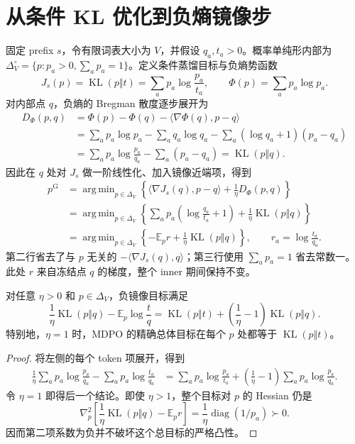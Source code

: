 \documentclass[lang=cn,scheme=chinese,openany]{../book/elegantbook}
\newcommand{\E}{\mathbb E}
\newcommand{\KL}{\operatorname{KL}}
\DeclareMathOperator*{\argmin}{arg\,min}
\begin{document}
\section{从条件 KL 优化到负熵镜像步}
\label{sec:foundation-origin}
固定 prefix $s$，令有限词表大小为 $V$，并假设 $q_a,t_a>0$。概率单纯形内部为 $\Delta_V^\circ=\{p:p_a>0,\sum_a p_a=1\}$。定义条件蒸馏目标与负熵势函数
\begin{equation}
J_s(p)=\KL(p\Vert t)=\sum_a p_a\log\frac{p_a}{t_a},\qquad
\Phi(p)=\sum_a p_a\log p_a.
\end{equation}
对内部点 $q$，负熵的 Bregman 散度逐步展开为
\begin{align}
D_\Phi(p,q)
&=\Phi(p)-\Phi(q)-\langle\nabla\Phi(q),p-q\rangle\\
&=\sum_a p_a\log p_a-\sum_a q_a\log q_a
-\sum_a(\log q_a+1)(p_a-q_a)\\
&=\sum_a p_a\log\frac{p_a}{q_a}-\sum_a(p_a-q_a)
=\KL(p\Vert q).
\end{align}
因此在 $q$ 处对 $J_s$ 做一阶线性化、加入镜像近端项，得到
\begin{align}
p^{\mathrm G}
&=\argmin_{p\in\Delta_V}\left\{
\langle\nabla J_s(q),p-q\rangle+\frac1\eta D_\Phi(p,q)\right\}\\
&=\argmin_{p\in\Delta_V}\left\{
\sum_a p_a\left(\log\frac{q_a}{t_a}+1\right)
+\frac1\eta\KL(p\Vert q)\right\}\\
&=\argmin_{p\in\Delta_V}\left\{-\E_p r+\frac1\eta\KL(p\Vert q)\right\},
\qquad r_a=\log\frac{t_a}{q_a}.
\label{eq:foundation-md-origin}
\end{align}
第二行省去了与 $p$ 无关的 $-\langle\nabla J_s(q),q\rangle$；第三行使用 $\sum_a p_a=1$ 省去常数一。此处 $r$ 来自冻结点 $q$ 的梯度，整个 inner 期间保持不变。

\begin{proposition}
\label{prop:foundation-kl-objective}
对任意 $\eta>0$ 和 $p\in\Delta_V$，负镜像目标满足
\begin{equation}
\frac1\eta\KL(p\Vert q)-\E_p\log\frac tq
=\KL(p\Vert t)+\left(\frac1\eta-1\right)\KL(p\Vert q).
\label{eq:foundation-kl-mixture}
\end{equation}
特别地，$\eta=1$ 时，MDPO 的精确总体目标在每个 $p$ 处都等于 $\KL(p\Vert t)$。
\end{proposition}
\begin{proof}
将左侧的每个 token 项展开，得到
\begin{align}
\frac1\eta\sum_a p_a\log\frac{p_a}{q_a}
-\sum_a p_a\log\frac{t_a}{q_a}
&=\sum_a p_a\log\frac{p_a}{t_a}
+\left(\frac1\eta-1\right)\sum_a p_a\log\frac{p_a}{q_a}.
\end{align}
令 $\eta=1$ 即得后一个结论。即使 $\eta>1$，整个目标对 $p$ 的 Hessian 仍是
\begin{equation}
\nabla_p^2\left[\frac1\eta\KL(p\Vert q)-\E_p r\right]
=\frac1\eta\operatorname{diag}(1/p_a)\succ0.
\end{equation}
因而第二项系数为负并不破坏这个总目标的严格凸性。
\end{proof}
\end{document}
